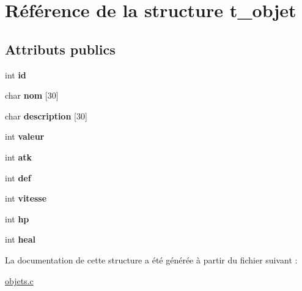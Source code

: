 \hypertarget{structt__objet}{\section{Référence de la structure t\-\_\-objet}
\label{structt__objet}
}
\subsection*{Attributs publics}
\begin{DoxyCompactItemize}
\item 
\hypertarget{structt__objet_abcc24553bb0ca3f83309115a8d31baac}{int {\bfseries id}}\label{structt__objet_abcc24553bb0ca3f83309115a8d31baac}

\item 
\hypertarget{structt__objet_ae64d0e39a94714aaca24de7c1579f7a3}{char {\bfseries nom} \mbox{[}30\mbox{]}}\label{structt__objet_ae64d0e39a94714aaca24de7c1579f7a3}

\item 
\hypertarget{structt__objet_a8fe10995433991b8f33e00c073b922be}{char {\bfseries description} \mbox{[}30\mbox{]}}\label{structt__objet_a8fe10995433991b8f33e00c073b922be}

\item 
\hypertarget{structt__objet_a64b456ca55684fc440d106dff2ab6afd}{int {\bfseries valeur}}\label{structt__objet_a64b456ca55684fc440d106dff2ab6afd}

\item 
\hypertarget{structt__objet_aa3bd9e4cfdefa0bda7299a54c33d0137}{int {\bfseries atk}}\label{structt__objet_aa3bd9e4cfdefa0bda7299a54c33d0137}

\item 
\hypertarget{structt__objet_a22cf6981480055f259e4ce21cfc3ca55}{int {\bfseries def}}\label{structt__objet_a22cf6981480055f259e4ce21cfc3ca55}

\item 
\hypertarget{structt__objet_ae4738ddad00c9a26397c0d11a5eca398}{int {\bfseries vitesse}}\label{structt__objet_ae4738ddad00c9a26397c0d11a5eca398}

\item 
\hypertarget{structt__objet_a8b79bcbd5f961a24e09610355bab76b2}{int {\bfseries hp}}\label{structt__objet_a8b79bcbd5f961a24e09610355bab76b2}

\item 
\hypertarget{structt__objet_a1ddaf153c8ca3febf5a47a40a0a88209}{int {\bfseries heal}}\label{structt__objet_a1ddaf153c8ca3febf5a47a40a0a88209}

\end{DoxyCompactItemize}


La documentation de cette structure a été générée à partir du fichier suivant \-:\begin{DoxyCompactItemize}
\item 
\hyperlink{objets_8c}{objets.\-c}\end{DoxyCompactItemize}
